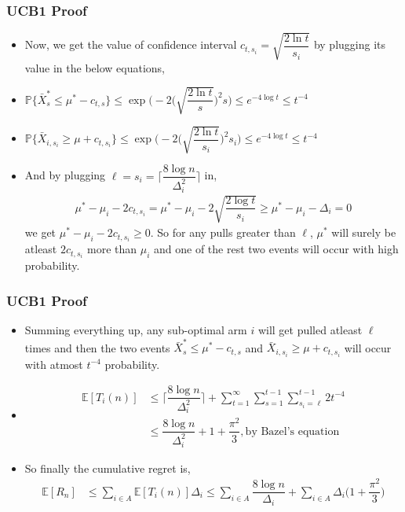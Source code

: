 \begin{frame}
\frametitle{UCB1 Proof}
\begin{itemize}
\item<0-> Now, we get the value of confidence interval $c_{t,s_i}=\sqrt{\dfrac{2\ln t}{s_i}}$ by plugging its value in the below equations,
\item<1-> $\mathbb{P}\lbrace  \bar{X}^{*}_{s}\leq \mu^* - c_{t,s}\rbrace\leq \exp\bigg(-2\big(\sqrt{\dfrac{2\ln t}{s}}\big)^2 s\bigg) \leq e^{-4\log t} \leq t^{-4}$
\item<2-> $\mathbb{P}\lbrace \bar{X}_{i,s_i} \geq \mu + c_{t,s_i}\rbrace\leq \exp\bigg(-2\big(\sqrt{\dfrac{2\ln t}{s_i}}\big)^2 s_i\bigg) \leq e^{-4\log t} \leq t^{-4}$
\item<3-> And by plugging $\ell=s_i =\bigg\lceil \dfrac{8\log n}{\Delta_{i}^{2}}\bigg\rceil$ in,
\begin{align*}
\mu^* - \mu_i - 2c_{t,s_i} = \mu^* - \mu_i - 2\sqrt{\dfrac{2\log t}{s_i}} \geq \mu^* - \mu_i -\Delta_i =0
\end{align*} 
we get $\mu^* - \mu_i - 2c_{t,s_i} \geq 0$. So for any pulls greater than $\ell$, $\mu^*$ will surely be atleast $2c_{t,s_i}$  more than $\mu_i$ and one of the rest two events will occur with high probability.
\end{itemize}
\end{frame}

\begin{frame}
\frametitle{UCB1 Proof}
\begin{itemize}
\item<1-> Summing everything up, any sub-optimal arm $i$ will get pulled atleast $\ell$ times and then the two events $\bar{X}^{*}_{s}\leq \mu^* - c_{t,s}$ and $\bar{X}_{i,s_i}\geq \mu + c_{t,s_i}$ will occur with atmost $t^{-4}$ probability.
\item<2-> \begin{align*}
\mathbb{E}[T_{i}(n)]&\leq \bigg\lceil \dfrac{8\log n}{\Delta_{i}^{2}}\bigg\rceil + \sum_{t=1}^{\infty}\sum_{s=1}^{t-1}\sum_{s_i =\ell}^{t-1}2t^{-4}\\
&\leq \dfrac{8\log n}{\Delta_{i}^{2}} +1 + \dfrac{\pi^{2}}{3}, \text{by Bazel's equation}
\end{align*}
\item<3-> So finally the cumulative regret is,
\begin{align*}
\mathbb{E}[R_n]&\leq \sum_{i\in A}\mathbb{E}[T_i (n)]\Delta_i
\leq \sum_{i\in A}\dfrac{8\log n}{\Delta_{i}} + \sum_{i\in A}\Delta_{i}\bigg(1 + \dfrac{\pi^{2}}{3}\bigg)
\end{align*}
\end{itemize}
\end{frame}